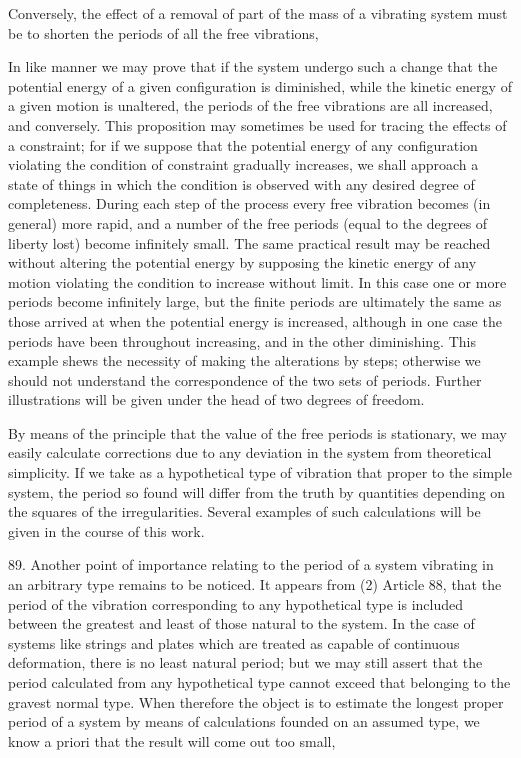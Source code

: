 Conversely, the effect of a removal of part of the mass of a vibrating system
must be to shorten the periods of all the free vibrations,

In like manner we may prove that if the system undergo such a change that the
potential energy of a given configuration is diminished, while the kinetic
energy of a given motion is unaltered, the periods of the free vibrations are
all increased, and conversely. This proposition may sometimes be used for
tracing the effects of a constraint; for if we suppose that the potential
energy of any configuration violating the condition of constraint gradually
increases, we shall approach a state of things in which the condition is
observed with any desired degree of completeness. During each step of the
process every free vibration becomes (in general) more rapid, and a number of
the free periods (equal to the degrees of liberty lost) become infinitely
small. The same practical result may be reached without altering the potential
energy by supposing the kinetic energy of any motion violating the condition to
increase without limit. In this case one or more periods become infinitely
large, but the finite periods are ultimately the same as those arrived at when
the potential energy is increased, although in one case the periods have been
throughout increasing, and in the other diminishing. This example shews the
necessity of making the alterations by steps; otherwise we should not
understand the correspondence of the two sets of periods. Further illustrations
will be given under the head of two degrees of freedom.

By means of the principle that the value of the free periods is stationary, we
may easily calculate corrections due to any deviation in the system from
theoretical simplicity. If we take as a hypothetical type of vibration that
proper to the simple system, the period so found will differ from the truth by
quantities depending on the squares of the irregularities. Several examples of
such calculations will be given in the course of this work.

89. Another point of importance relating to the period of a system vibrating in
an arbitrary type remains to be noticed. It appears from (2) Article 88, that
the period of the vibration corresponding to any hypothetical type is included
between the greatest and least of those natural to the system. In the case of
systems like strings and plates which are treated as capable of continuous
deformation, there is no least natural period; but we may still assert that the
period calculated from any hypothetical type cannot exceed that belonging to
the gravest normal type. When therefore the object is to estimate the longest
proper period of a system by means of calculations founded on an assumed type,
we know a priori that the result will come out too small,

